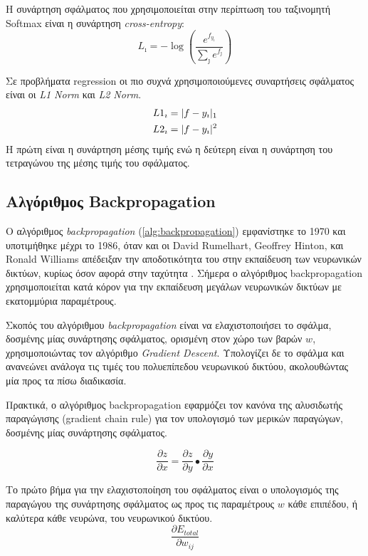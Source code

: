 Η συνάρτηση σφάλματος που χρησιμοποιείται στην περίπτωση του ταξινομητή Softmax 
είναι η συνάρτηση \emph{cross-entropy}:
\begin{equation*}
  L_{\imath} = - \log{(\frac{e^{f_{y_{\imath}}}}{\sum_{\jmath}^{} e^{f_{\jmath}}})}
\end{equation*}


Σε προβλήματα regression οι πιο συχνά χρησιμοποιούμενες συναρτήσεις
σφάλματος είναι οι \emph{L1 Norm} και \emph{L2 Norm}.
\begin{gather*}
  L1_{\imath} = \lvert f - y_{\imath}\rvert_{1} \\
  L2_{\imath} = \lvert f - y_{\imath}\rvert^{2}
\end{gather*}
Η πρώτη είναι η συνάρτηση μέσης τιμής ενώ η δεύτερη
είναι η συνάρτηση του τετραγώνου της μέσης τιμής του σφάλματος.

\subsection{Αλγόριθμος Backpropagation}

Ο αλγόριθμος \emph{backpropagation} (\autoref{alg:backpropagation}) εμφανίστηκε το 1970 και υποτιμήθηκε
μέχρι το 1986, όταν και οι David Rumelhart, Geoffrey Hinton, και Ronald Williams
απέδειξαν την αποδοτικότητα του στην εκπαίδευση των νευρωνικών δικτύων, κυρίως
όσον αφορά στην ταχύτητα \cite{rumelhart1988learning}.
Σήμερα ο αλγόριθμος backpropagation χρησιμοποιείται κατά κόρον για την εκπαίδευση
μεγάλων νευρωνικών δικτύων με εκατομμύρια παραμέτρους.

Σκοπός του αλγόριθμου \emph{backpropagation} είναι να
ελαχιστοποιήσει το σφάλμα, δοσμένης μίας συνάρτησης σφάλματος, ορισμένη στον χώρο
των βαρών $w$, χρησιμοποιώντας τον αλγόριθμο \emph{Gradient Descent}.
Υπολογίζει δε το σφάλμα και ανανεώνει ανάλογα τις τιμές του
πολυεπίπεδου νευρωνικού δικτύου, ακολουθώντας μία προς τα πίσω διαδικασία.

Πρακτικά, ο αλγόριθμος backpropagation εφαρμόζει τον κανόνα
της αλυσιδωτής παραγώγισης (gradient chain rule) για τον υπολογισμό των
μερικών παραγώγων, δοσμένης μίας συνάρτησης σφάλματος.

\begin{equation*}
  \frac{\partial z}{\partial x} = \frac{\partial z}{\partial y}\bullet\frac{\partial y}{\partial x}
\end{equation*}

Το πρώτο βήμα για την ελαχιστοποίηση του σφάλματος είναι ο υπολογισμός
της παραγώγου της συνάρτησης σφάλματος ως προς τις παραμέτρους $w$ κάθε επιπέδου,
ή καλύτερα κάθε νευρώνα, του νευρωνικού δικτύου.
\begin{equation*}
  \frac{\partial E_{total}}{\partial w_{ij}}
\end{equation*}

